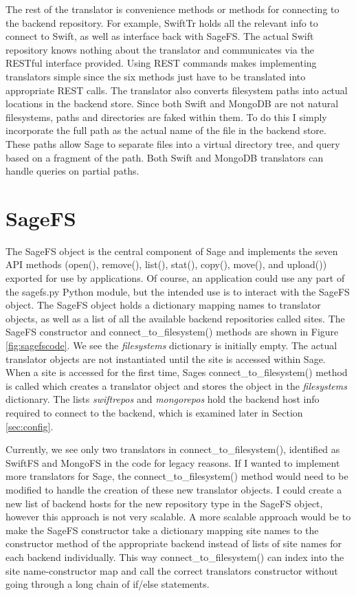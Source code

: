 The rest of the translator is convenience methods or methods for connecting to the backend repository. For example, SwiftTr holds all the relevant info to connect to Swift, as well as interface back with SageFS. The actual Swift repository knows nothing about the translator and communicates via the RESTful interface provided. Using REST commands makes implementing translators simple since the six methods just have to be translated into appropriate REST calls. The translator also converts filesystem paths into actual locations in the backend store. Since both Swift and MongoDB are not natural filesystems, paths and directories are faked within them. To do this I simply incorporate the full path as the actual name of the file in the backend store. These paths allow Sage to separate files into a virtual directory tree, and query based on a fragment of the path. Both Swift and MongoDB translators can handle queries on partial paths.


\section{SageFS}

The SageFS object is the central component of Sage and implements the seven API methods (open(), remove(), list(), stat(), copy(), move(), and upload()) exported for use by applications. Of course, an application could use any part of the sagefs.py Python module, but the intended use is to interact with the SageFS object. The SageFS object holds a dictionary mapping names to translator objects, as well as a list of all the available backend repositories called sites. The SageFS constructor and connect\_to\_filesystem() methods are shown in Figure \ref{fig:sagefscode}. We see the \textit{filesystems} dictionary is initially  empty. The actual translator objects are not instantiated until the site is accessed within Sage. When a site is accessed for the first time, Sages connect\_to\_filesystem() method is called which creates a translator object and stores the object in the \textit{filesystems} dictionary. The lists \textit{swiftrepos} and \textit{mongorepos} hold the backend host info required to connect to the backend, which is examined later in Section \ref{sec:config}.

Currently, we see only two translators in connect\_to\_filesystem(), identified as SwiftFS and MongoFS in the code for legacy reasons. If I wanted to implement more translators for Sage, the connect\_to\_filesystem() method would need to be modified to handle the creation of these new translator objects. I could create a new list of backend hosts for the new repository type in the SageFS object, however this approach is not very scalable. A more scalable approach would be to make the SageFS constructor take a dictionary mapping site names to the constructor method of the appropriate backend instead of lists of site names for each backend individually. This way connect\_to\_filesystem() can index into the site name-constructor map and call the correct translators constructor without going through a long chain of if/else statements.

